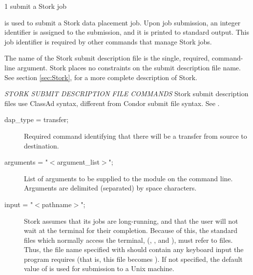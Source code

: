 \begin{ManPage}{\label{man-stork-submit}}{1}
{submit a Stork job}

\Synopsis {}
\ToolArgsBase

\Storkname
{}


\Description 

 is used to submit a Stork data placement job.
Upon job submission, an integer identifier is assigned to the
submission,
	and it is printed to standard output.
This job identifier is required by other commands
that manage Stork jobs.

The name of the Stork submit description file is the single,
required, command-line argument.
Stork places no constraints on the submit
description file name.
See section \ref{sec:Stork}, for a more 
complete description of Stork.

\emph{STORK SUBMIT DESCRIPTION FILE COMMANDS}
Stork submit description files use ClassAd syntax, different from Condor submit
file syntax.  See .

\begin{description}

\item[dap\_type = transfer;]
Required command identifying that there will be
a transfer from source to destination.


\item[arguments = "$<$argument\_list$>$";]
List of arguments to be supplied
to the module on the command line.
Arguments are delimited (separated) by space characters.


\item[input = "$<$pathname$>$";]
Stork assumes that its jobs are
long-running, and that the user will not wait at the terminal for their
completion. Because of this, the standard files which normally access
the terminal, (, , and ),
must refer to files. Thus,
the file name specified with  should contain any keyboard
input the program requires (that is, this file becomes ).
If not specified, the default value
of  is used for submission to a Unix machine.


\end{description}
\end{ManPage}
